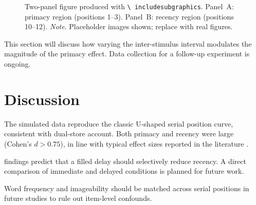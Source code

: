 \documentclass[man,floatsintext]{apa6}   %
\begin{document}
\begin{figure}[htbp]
  \caption{Two-panel figure produced with \texttt{\textbackslash
    includesubgraphics}. Panel~A: primacy region (positions 1--3).
    Panel~B: recency region (positions 10--12). \textit{Note}. Placeholder
    images shown; replace with real figures.}
  \label{fig:panels}
\end{figure}


This section will discuss how varying the inter-stimulus interval modulates
the magnitude of the primacy effect. Data collection for a follow-up
experiment is ongoing.

\section{Discussion}

The simulated data reproduce the classic U-shaped serial position curve,
consistent with \cites{AtkinsonShiffrin1968} dual-store account. Both primacy
and recency were large (Cohen's $d > 0.75$), in line with typical
effect sizes reported in the literature .



\cites{GlanzerCunitz1966} findings predict that a filled delay should
selectively reduce recency. A direct comparison of immediate and delayed
conditions is planned for future work.


Word frequency and imageability should be matched across serial positions in
future studies to rule out item-level confounds.


\end{document}
